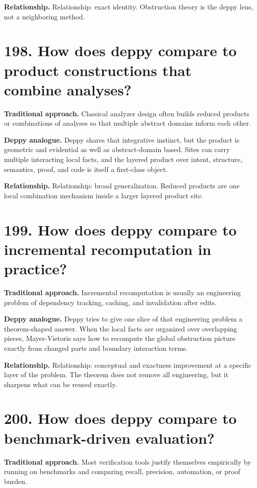 \documentclass[11pt,openany]{book}
\begin{document}
\textbf{Relationship.} Relationship: exact identity. Obstruction theory is the deppy lens, not a neighboring method.

\section*{198. How does deppy compare to product constructions that combine analyses?}
\textbf{Traditional approach.} Classical analyzer design often builds reduced products or combinations of analyses so that multiple abstract domains inform each other.

\textbf{Deppy analogue.} Deppy shares that integrative instinct, but the product is geometric and evidential as well as abstract-domain based. Sites can carry multiple interacting local facts, and the layered product over intent, structure, semantics, proof, and code is itself a first-class object.

\textbf{Relationship.} Relationship: broad generalization. Reduced products are one local combination mechanism inside a larger layered product site.

\section*{199. How does deppy compare to incremental recomputation in practice?}
\textbf{Traditional approach.} Incremental recomputation is usually an engineering problem of dependency tracking, caching, and invalidation after edits.

\textbf{Deppy analogue.} Deppy tries to give one slice of that engineering problem a theorem-shaped answer. When the local facts are organized over overlapping pieces, Mayer-Vietoris says how to recompute the global obstruction picture exactly from changed parts and boundary interaction terms.

\textbf{Relationship.} Relationship: conceptual and exactness improvement at a specific layer of the problem. The theorem does not remove all engineering, but it sharpens what can be reused exactly.

\section*{200. How does deppy compare to benchmark-driven evaluation?}
\textbf{Traditional approach.} Most verification tools justify themselves empirically by running on benchmarks and comparing recall, precision, automation, or proof burden.
\end{document}
